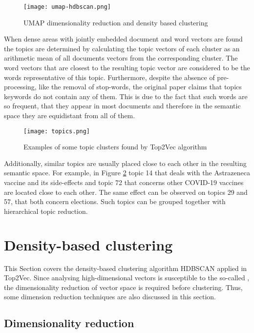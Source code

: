 \documentclass[fontsize=12pt,a4paper,twoside,openany]{scrbook}
\begin{document}
\begin{figure}[h]
\centering
\texttt{[image: umap-hdbscan.png]}
\caption{UMAP dimensionality reduction and density based clustering \parencite[see also][]{Angelov20}}
\label{fig:umap-hdbscan}
\end{figure}

When dense areas with jointly embedded document and word vectors are found the topics are determined by calculating the topic vectors of each cluster as an arithmetic mean of all documents vectors from the corresponding cluster. The word vectors that are closest to the resulting topic vector are considered to be the words representative of this topic. Furthermore, despite the absence of pre-processing, like the removal of stop-words, the original paper claims that topics keywords do not contain any of them. This is due to the fact that such words are so frequent, that they appear in most documents and therefore in the semantic space they are equidistant from all of them.

\begin{figure}[h]
\centering
\texttt{[image: topics.png]}
\caption{Examples of some topic clusters found by Top2Vec algorithm}
\label{fig:topics}
\end{figure}

Additionally, similar topics are usually placed close to each other in the resulting semantic space. For example, in Figure \ref{fig:topics} topic 14 that deals with the Astrazeneca vaccine and its side-effects and topic 72 that concerns other COVID-19 vaccines are located close to each other. The same effect can be observed on topics 29 and 57, that both concern elections. Such topics can be grouped together with hierarchical topic reduction.


\section{Density-based clustering}
\label{sec:C}

This Section covers the density-based clustering algorithm HDBSCAN applied in Top2Vec. Since analysing high-dimensional vectors is susceptible to the so-called  \parencite{Theodoridis08}, the dimensionality reduction of vector space is required before clustering. Thus, some dimension reduction techniques are also discussed in this section.

\subsection{Dimensionality reduction}
\label{sec:umap}
\end{document}

